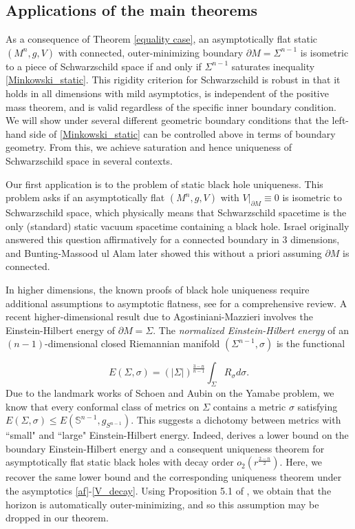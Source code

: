 \documentclass[12pt,twoside]{article}
\theoremstyle{plain}
\theoremstyle{definition}
\theoremstyle{remark}
\numberwithin{equation}{section}
\begin{document}
\subsection{Applications of the main theorems}

As a consequence of Theorem \ref{equality case}, an asymptotically flat static $(M^{n},g,V)$ with connected, outer-minimizing boundary $\partial M=\Sigma^{n-1}$ is isometric to a piece of Schwarzschild space if and only if $\Sigma^{n-1}$ saturates inequality \eqref{Minkowski_static}. This rigidity criterion for Schwarzschild is robust in that it holds in all dimensions with mild asymptotics, is independent of the positive mass theorem, and is valid regardless of the specific inner boundary condition. We will show under several different geometric boundary conditions that the left-hand side of \eqref{Minkowski_static} can be controlled above in terms of boundary geometry. From this, we achieve saturation and hence uniqueness of Schwarzschild space in several contexts.

Our first application is to the problem of static black hole uniqueness. This problem asks if an asymptotically flat $(M^{n},g,V)$ with $V|_{\partial M} \equiv 0$ is isometric to Schwarzschild space, which physically means that Schwarzschild spacetime is the only (standard) static vacuum spacetime containing a black hole. Israel \cite{Israel} originally answered this question affirmatively for a connected boundary in $3$ dimensions, and Bunting-Massood ul Alam \cite{BMA} later showed this without a priori assuming $\partial M$ is connected. 

In higher dimensions, the known proofs of black hole uniqueness require additional assumptions to asymptotic flatness, see \cite{HI12} for a comprehensive review. A recent higher-dimensional result due to Agostiniani-Mazzieri \cite{AM} involves the Einstein-Hilbert energy of $\partial M=\Sigma$. The \textit{normalized Einstein-Hilbert energy} of an $(n-1)$-dimensional closed Riemannian manifold $(\Sigma^{n-1},\sigma)$ is the functional

\begin{equation} \label{einstein_hilbert}
   E(\Sigma,\sigma) = \left( |\Sigma| \right)^{\frac{3-n}{n-1}} \int_{\Sigma} R_{\sigma} d\sigma.
\end{equation}
Due to the landmark works of Schoen \cite{Schoen} and Aubin \cite{Aub} on the Yamabe problem, we know that every conformal class of metrics on $\Sigma$ contains a metric $\sigma$ satisfying $E(\Sigma,\sigma) \leq E(\mathbb{S}^{n-1},g_{S^{n-1}})$. This suggests a dichotomy between metrics with ``small" and ``large" Einstein-Hilbert energy. Indeed, \cite{AM} derives a lower bound on the boundary Einstein-Hilbert energy and a consequent uniqueness theorem for asymptotically flat static black holes with decay order $o_{2}(r^ \frac{2-n}{2})$. Here, we recover the same lower bound and the corresponding uniqueness theorem under the asymptotics \eqref{af}-\eqref{V_decay}. Using Proposition 5.1 of \cite{BM23}, we obtain that the horizon is automatically outer-minimizing, and so this assumption may be dropped in our theorem.
\end{document}
